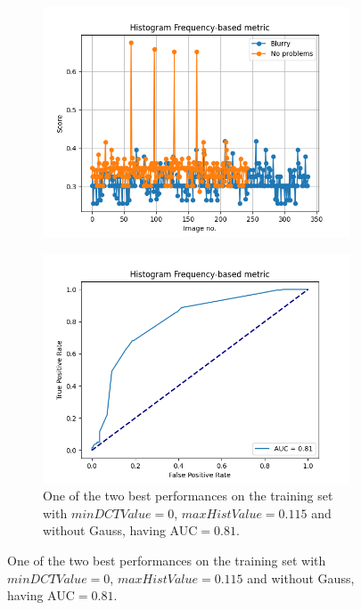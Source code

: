 \begin{figure}[H]
    \begin{subfigure}[t]{0.48\textwidth}
        \includegraphics[width=\textwidth]{Figures/BlurredImages/tweakHF/min0_max0.115_output_basic.png}
        \caption{}
        \label{fig:HF_basic_115}
    \end{subfigure}\hspace{1em}
    \begin{subfigure}[t]{0.48\textwidth}
        \includegraphics[width=\textwidth]{Figures/BlurredImages/tweakHF/min0_max0.115_output_roc.png}
        \caption{One of the two best performances on the training set with $minDCTValue=0$, $maxHistValue=0.115$ and without Gauss, having AUC$=0.81$.}

\end{subfigure}
\end{figure}
